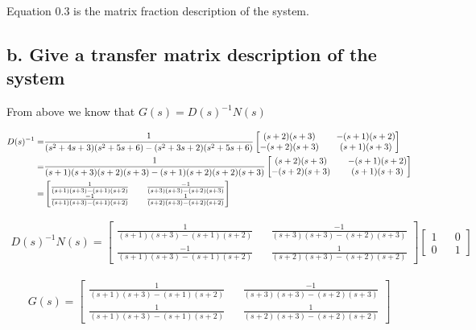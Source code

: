 \documentclass[paper=a4,margin, fontsize=11pt]{scrartcl} %
\numberwithin{equation}{section} %
\numberwithin{figure}{section} %
\numberwithin{table}{section} %
\begin{document}
Equation 0.3 is the matrix fraction description of the system.

\subsection*{b. Give a transfer matrix description of the system}

From above we know that $G(s)=D(s)^{-1}N(s)$

\begin{align*}
D(s)^{-1}=&\frac{1}{(s^2+4s+3)(s^2+5s+6)-(s^2+3s+2)(s^2+5s+6)}
\begin{bmatrix}(s+2)(s+3) && -(s+1)(s+2)\\ -(s+2)(s+3) && (s+1)(s+3)\end{bmatrix}\\
=&\frac{1}{(s+1)(s+3)(s+2)(s+3)-(s+1)(s+2)(s+2)(s+3)}
\begin{bmatrix}(s+2)(s+3) && -(s+1)(s+2)\\ -(s+2)(s+3) && (s+1)(s+3)\end{bmatrix}\\
\newline
=&\begin{bmatrix}
\frac{1}{(s+1)(s+3)-(s+1)(s+2)} && \frac{-1}{(s+3)(s+3)-(s+2)(s+3)}\\
\frac{-1}{(s+1)(s+3)-(s+1)(s+2)} && \frac{1}{(s+2)(s+3)-(s+2)(s+2)}
\end{bmatrix}
\end{align*}

\begin{align*}
D(s)^{-1}N(s)=\begin{bmatrix}
\frac{1}{(s+1)(s+3)-(s+1)(s+2)} && \frac{-1}{(s+3)(s+3)-(s+2)(s+3)}\\\frac{-1}{(s+1)(s+3)-(s+1)(s+2)} && \frac{1}{(s+2)(s+3)-(s+2)(s+2)}
\end{bmatrix} \begin{bmatrix}1 && 0\\ 0 && 1\end{bmatrix}
\end{align*}

\begin{align}
	G(s)= \begin{bmatrix} \frac{1}{(s+1)(s+3)-(s+1)(s+2)} && \frac{-1}{(s+3)(s+3)-(s+2)(s+3)} \\ \frac{1}{(s+1)(s+3)-(s+1)(s+2)} && \frac{1}{(s+2)(s+3)-(s+2)(s+2)}\end{bmatrix}
\end{align}
\end{document}
